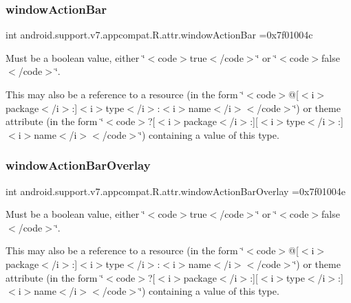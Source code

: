 \subsubsection{\texorpdfstring{window\+Action\+Bar}{windowActionBar}}
{\footnotesize\ttfamily int android.\+support.\+v7.\+appcompat.\+R.\+attr.\+window\+Action\+Bar =0x7f01004c\hspace{0.3cm}{\ttfamily [static]}}

Must be a boolean value, either \char`\"{}$<$code$>$true$<$/code$>$\char`\"{} or \char`\"{}$<$code$>$false$<$/code$>$\char`\"{}. 

This may also be a reference to a resource (in the form \char`\"{}$<$code$>$@\mbox{[}$<$i$>$package$<$/i$>$\+:\mbox{]}$<$i$>$type$<$/i$>$\+:$<$i$>$name$<$/i$>$$<$/code$>$\char`\"{}) or theme attribute (in the form \char`\"{}$<$code$>$?\mbox{[}$<$i$>$package$<$/i$>$\+:\mbox{]}\mbox{[}$<$i$>$type$<$/i$>$\+:\mbox{]}$<$i$>$name$<$/i$>$$<$/code$>$\char`\"{}) containing a value of this type. \mbox{\label{classandroid_1_1support_1_1v7_1_1appcompat_1_1R_1_1attr_a1b21b31c31a8d3a7cef82b24287132a3}} 
\subsubsection{\texorpdfstring{window\+Action\+Bar\+Overlay}{windowActionBarOverlay}}
{\footnotesize\ttfamily int android.\+support.\+v7.\+appcompat.\+R.\+attr.\+window\+Action\+Bar\+Overlay =0x7f01004e\hspace{0.3cm}{\ttfamily [static]}}

Must be a boolean value, either \char`\"{}$<$code$>$true$<$/code$>$\char`\"{} or \char`\"{}$<$code$>$false$<$/code$>$\char`\"{}. 

This may also be a reference to a resource (in the form \char`\"{}$<$code$>$@\mbox{[}$<$i$>$package$<$/i$>$\+:\mbox{]}$<$i$>$type$<$/i$>$\+:$<$i$>$name$<$/i$>$$<$/code$>$\char`\"{}) or theme attribute (in the form \char`\"{}$<$code$>$?\mbox{[}$<$i$>$package$<$/i$>$\+:\mbox{]}\mbox{[}$<$i$>$type$<$/i$>$\+:\mbox{]}$<$i$>$name$<$/i$>$$<$/code$>$\char`\"{}) containing a value of this type. \mbox{\label{classandroid_1_1support_1_1v7_1_1appcompat_1_1R_1_1attr_ac8444ac2d86dbdcb89e0cb5cb2a83541}} 
